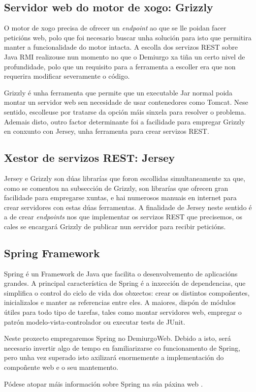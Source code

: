 \subsection{Servidor web do motor de xogo: Grizzly}
O motor de xogo precisa de ofrecer un \textit{endpoint} ao que se lle poidan
facer peticións web, polo que foi necesario buscar unha solución para isto que
permitira manter a funcionalidade do motor intacta. A escolla dos servizos REST
sobre Java RMI realizouse nun momento no que o Demiurgo xa tiña un certo nivel
de profundidade, polo que un requisito para a ferramenta a escoller era que non
requerira modificar severamente o código.
\par
Grizzly é unha ferramenta que permite que un executable Jar normal poida montar
un servidor web sen necesidade de usar contenedores como Tomcat. Nese sentido,
escolleuse por tratarse da opción máis sinxela para resolver o problema. Ademais
disto, outro factor determinante foi a facilidade para empregar Grizzly en
conxunto con Jersey, unha ferramenta para crear servizos REST.

\subsection{Xestor de servizos REST: Jersey}
Jersey e Grizzly son dúas librarías que foron escollidas simultaneamente xa que,
como se comentou na subsección de Grizzly, son librarías que ofrecen gran
facilidade para empregarse xuntas, e hai numerosos manuais en internet para
crear servidores con estas dúas ferramentas. A finalidade de Jersey neste
sentido é a de crear \textit{endpoints} nos que implementar os servizos REST que
precisemos, os cales se encargará Grizzly de publicar nun servidor para recibir
peticións.

\subsection{Spring Framework}
Spring é un Framework de Java que facilita o desenvolvemento de aplicacións
grandes. A principal característica de Spring é a inxección de dependencias, que
simplifica o control do ciclo de vida dos obxectos: crear os distintos
compoñentes, inicializalos e manter as referencias entre eles. A maiores, dispón
de módulos útiles para todo tipo de tarefas, tales como montar servidores web,
empregar o patrón modelo-vista-controlador ou executar tests de JUnit.
\par
Neste proxecto empregaremos Spring no DemiurgoWeb. Debido a isto, será necesario
invertir algo de tempo en familiarizarse co funcionamento de Spring, pero unha
vez superado isto axilizará enormemente a implementación do compoñente web e o
seu mantemento.
\par
Pódese atopar máis información sobre Spring na súa páxina web \cite{spring}.

